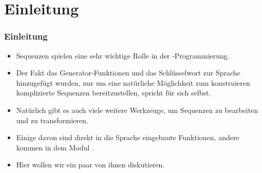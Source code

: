\documentclass[aspectratio=169,mathserif,notheorems]{beamer}%
\subtitle{40.~Operationen für Iteratoren}%
\begin{document}
%
%
\startPresentation%
%
\section{Einleitung}%
\begin{frame}%
\frametitle{Einleitung}%
\begin{itemize}%
\item Sequenzen spielen eine sehr wichtige Rolle in der \python-Programmierung.%
%
\item<2-> Der Fakt das Generator-Funktionen und das Schlüsselwort  zur Sprache hinzugefügt wurden, nur um eine natürliche Möglichkeit zum konstruieren komplizierte Sequenzen bereitzustellen, spricht für sich selbst.%
%
\item<3-> Natürlich gibt es auch viele weitere Werkzeuge, um Sequenzen zu bearbeiten und zu transformieren.%
%
\item<4-> Einige davon sind direkt in die Sprache eingebaute Funktionen, andere kommen in dem Modul .%
%
\item<5-> Hier wollen wir ein paar von ihnen diskutieren.%
\end{itemize}
\end{frame}%
%
\end{document}
